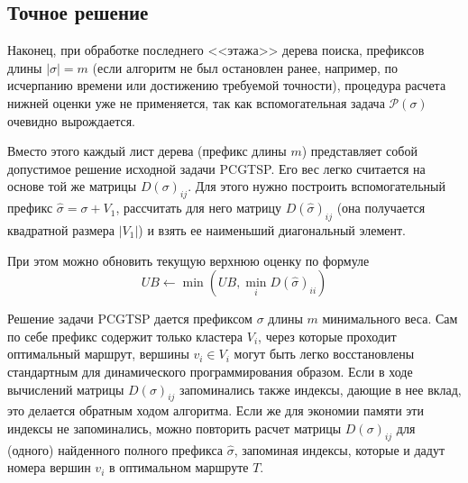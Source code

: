 
\subsection{Точное решение}
\label{sec:pgstcp.solution}

Наконец,
при обработке последнего
<<этажа>> дерева поиска,
префиксов длины
$|\sigma|=m$
(если алгоритм не был остановлен ранее,
например, по исчерпанию времени или
достижению требуемой точности),
процедура расчета нижней оценки уже не применяется,
так как вспомогательная задача
$\mathcal P(\sigma)$
очевидно вырождается.

Вместо этого каждый лист дерева
(префикс длины $m$)
представляет собой допустимое решение
исходной задачи PCGTSP.
Его вес легко считается на основе той же матрицы
$D(\sigma)_{ij}$.
Для этого нужно построить
вспомогательный префикс
$\hat \sigma = \sigma + V_1$,
рассчитать для него матрицу
$D(\hat \sigma)_{ij}$
(она получается квадратной размера $|V_1|$)
и взять ее наименьший диагональный элемент.

При этом можно обновить текущую верхнюю оценку
по формуле
$$
UB \gets \min(UB, \min_i D(\hat \sigma)_{ii})
$$

Решение задачи PCGTSP дается префиксом $\sigma$
длины $m$ минимального веса.
Сам по себе префикс содержит только кластера $V_i$,
через которые проходит оптимальный маршрут,
вершины $v_i \in V_i$
могут быть легко восстановлены стандартным
для динамического программирования образом.
Если в ходе вычислений матрицы
$D(\sigma)_{ij}$
запоминались также индексы,
дающие в нее вклад,
это делается обратным ходом алгоритма.
Если же для экономии памяти
эти индексы не запоминались,
можно повторить расчет матрицы
$D(\sigma)_{ij}$
для (одного) найденного полного префикса $\hat \sigma$,
запоминая индексы,
которые и дадут номера вершин
$v_i$
в оптимальном маршруте $T$.
